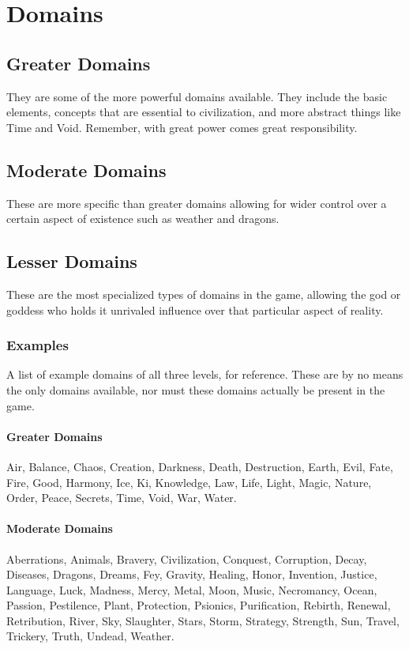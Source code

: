 \documentclass[10pt,a4paper]{article}
\author{Frà}
\begin{document}
\section*{Domains}
\subsection*{Greater Domains} They are some of the more powerful domains available. They include the basic elements, concepts that are essential to civilization, and more abstract things like Time and Void. Remember, with great power comes great responsibility.

\subsection*{Moderate Domains} These are more specific than greater domains allowing for wider control over a certain aspect of existence such as weather and dragons.

\subsection*{Lesser Domains} These are the most specialized types of domains in the game, allowing the god or goddess who holds it unrivaled influence over that particular aspect of reality.
\subsubsection*{Examples}
A list of example domains of all three levels, for reference. These are by no means the only domains available, nor must these domains actually be present in the game.

\paragraph*{Greater Domains}
Air, Balance, Chaos, Creation, Darkness, Death, Destruction, Earth, Evil, Fate, Fire, Good, Harmony, Ice, Ki, Knowledge, Law, Life, Light, Magic, Nature, Order, Peace, Secrets, Time, Void, War, Water.

\paragraph*{Moderate Domains}
Aberrations, Animals, Bravery, Civilization, Conquest, Corruption, Decay, Diseases, Dragons, Dreams, Fey, Gravity, Healing, Honor, Invention, Justice, Language, Luck, Madness, Mercy, Metal, Moon, Music, Necromancy, Ocean, Passion, Pestilence, Plant, Protection, Psionics, Purification, Rebirth, Renewal, Retribution, River, Sky, Slaughter, Stars, Storm, Strategy, Strength, Sun, Travel, Trickery, Truth, Undead, Weather.
\end{document}
